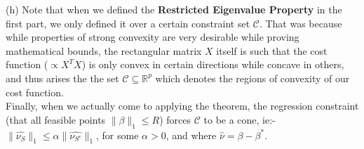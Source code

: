 \documentclass[a4paper,11pt]{article}
\numberwithin{definition}{section}
\numberwithin{mytheorem}{subsection}
\begin{document}
(h) Note that when we defined the \textbf{Restricted Eigenvalue Property} in the first part, we only defined it over a certain constraint set $\mathcal{C}$. That was because while properties of strong convexity are very desirable while proving mathematical bounds, the rectangular matrix $X$ itself is such that the cost function ($\propto X^TX$) is only convex in certain directions while concave in others, and thus arises the the set $\mathcal{C}\subseteq\mathbb{R}^p$ which denotes the regions of convexity of our cost function. \\
Finally, when we actually come to applying the theorem, the regression constraint (that all feasible points $\lVert\beta\rVert_1\leq R$) forces $\mathcal{C}$ to be a cone, ie:- $\lVert\widehat{\nu_S}\rVert_1\leq\alpha\lVert\widehat{\nu_{S^c}}\rVert_1$, for some $\alpha > 0$, and where $\widehat{\nu} = \beta - \beta^*$.


%     
%     
%     
\end{document}

